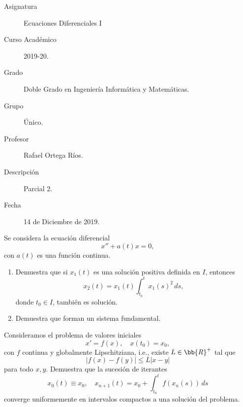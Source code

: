 \documentclass[12pt]{article}
\begin{document}

    
    

    \begin{description}
        \item[Asignatura] Ecuaciones Diferenciales I
        \item[Curso Académico] 2019-20.
        \item[Grado] Doble Grado en Ingeniería Informática y Matemáticas.
        \item[Grupo] Único.
        \item[Profesor] Rafael Ortega Ríos.
        \item[Descripción] Parcial 2.
        \item[Fecha] 14 de Diciembre de 2019.
    \end{description}
    \newpage

    \begin{ejercicio}
        Se considera la ecuación diferencial
        \[
            x'' + a(t)x = 0,
        \]
        con $a(t)$ es una función continua.
        \begin{enumerate}
            \item Demuestra que si $x_1(t)$ es una solución positiva definida en $I$, entonces
            \[
                x_2(t) = x_1(t) \int_{t_0}^{t} x_1(s)^2 \, ds,
            \]
            donde $t_0 \in I$, también es solución.
            \item Demuestra que forman un sistema fundamental.
        \end{enumerate}
    \end{ejercicio}

    \begin{ejercicio}
        Consideramos el problema de valores iniciales
        \[
            x' = f(x), \quad x(t_0) = x_0,
        \]
        con $f$ continua y globalmente Lipschitziana, i.e., existe $L\in \bb{R}^+$ tal que
        \[
            |f(x) - f(y)| \leq L|x - y|
        \]
        para todo $x, y$. Demuestra que la sucesión de iterantes
        \[
            x_0(t) \equiv x_0, \quad x_{n+1}(t) = x_0 + \int_{t_0}^{t} f(x_n(s)) \, ds
        \]
        converge uniformemente en intervalos compactos a una solución del problema.
    \end{ejercicio}
\end{document}
